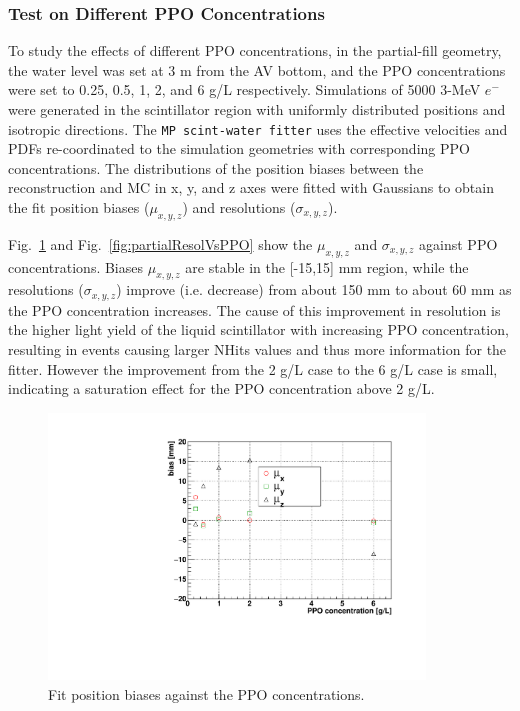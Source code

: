 \subsubsection{Test on Different PPO Concentrations}\label{sect:ppoConcentration}

To study the effects of different PPO concentrations, in the partial-fill geometry, the water level was set at 3 m from the AV bottom, and the PPO concentrations were set to 0.25, 0.5, 1, 2, and 6 g/L respectively. Simulations of 5000 3-MeV $e^-$ were generated in the scintillator region with uniformly distributed positions and isotropic directions. The \texttt{MP scint-water fitter} uses the effective velocities and PDFs re-coordinated to the simulation geometries with corresponding PPO concentrations. The distributions of the position biases between the reconstruction and MC in x, y, and z axes were fitted with Gaussians to obtain the fit position biases ($\mu_{x,y,z}$) and resolutions ($\sigma_{x,y,z}$).

Fig.~\ref{fig:partialBiasVsPPO} and Fig.~\ref{fig:partialResolVsPPO} show the $\mu_{x,y,z}$ and $\sigma_{x,y,z}$ against PPO concentrations. Biases $\mu_{x,y,z}$ are stable in the [-15,15] mm region, while the resolutions ($\sigma_{x,y,z}$) improve (i.e. decrease) from about 150 mm to about 60 mm as the PPO concentration increases. The cause of this improvement in resolution is the higher light yield of the liquid scintillator with increasing PPO concentration, resulting in events causing larger NHits values and thus more information for the fitter. However the improvement from the 2 g/L case to the 6 g/L case is small, indicating a saturation effect for the PPO concentration above 2 g/L.

\begin{figure}[!htb]
	\centering
	\includegraphics[width=10cm]{partialBiasVsPPO.pdf}
	\caption{Fit position biases against the PPO concentrations.	\label{fig:partialBiasVsPPO}}
\end{figure}

